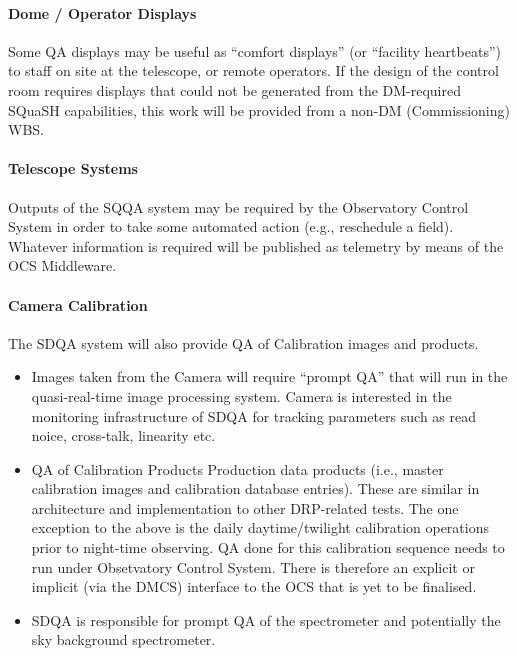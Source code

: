 \paragraph{Dome / Operator Displays}
\label{sec:qaDomeDisplay}

Some QA displays may be useful as ``comfort displays'' (or ``facility heartbeats'') to staff on site at the telescope, or remote operators. If the design of the control room requires displays that could not be generated from the DM-required SQuaSH capabilities, this work will be provided from a non-DM (Commissioning) WBS.

\paragraph{Telescope Systems}
\label{sec:qaTelescopeSystem}

Outputs of the SQQA system may be required by the Observatory Control System in order to take some automated action (e.g., reschedule a field). Whatever information is required will be published as telemetry by means of the OCS Middleware.

\paragraph{Camera Calibration}
\label{sec:qaCameraCalibration}

The SDQA system will also provide QA of Calibration images and products.

\begin{itemize}

\item Images taken from the Camera will require ``prompt QA'' that will run in the quasi-real-time image processing system. Camera is interested in the monitoring infrastructure of SDQA for tracking parameters such as read noice, cross-talk, linearity etc.

\item QA of Calibration Products Production data products (i.e., master calibration images and calibration database entries). These are similar in architecture and implementation to other DRP-related tests. The one exception to the above is the daily daytime/twilight calibration operations prior to night-time observing. QA done for this calibration sequence needs to run under Obsetvatory Control System. There is therefore an explicit or implicit (via the DMCS) interface to the OCS that is yet to be finalised. 

\item SDQA is responsible for prompt QA of the spectrometer and potentially the sky background spectrometer. 

\end{itemize}

